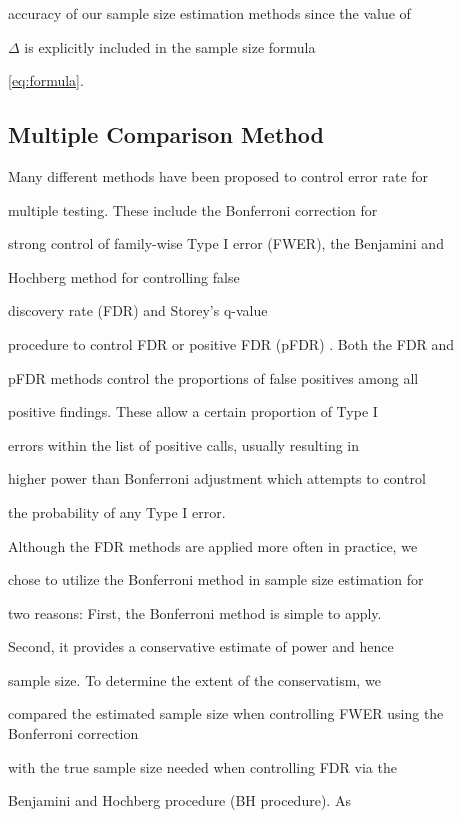 \documentclass[12pt]{article}
\begin{document}
accuracy of our sample size estimation methods since the value of

$\Delta$ is explicitly included in the sample size formula

\ref{eq:formula}.



\subsection{Multiple Comparison Method}



Many different methods have been proposed to control error rate for

multiple testing.  These include the Bonferroni correction for

strong control of family-wise Type I error (FWER), the Benjamini
and

Hochberg \citeyearpar{Benjamini95} method for controlling false

discovery rate (FDR) and Storey's \citeyearpar{Storey02} q-value

procedure to control FDR or positive FDR (pFDR) .  Both the FDR and

pFDR methods control the proportions of false positives among all

positive findings.  These allow a certain proportion of Type I

errors within the list of positive calls, usually resulting in

higher power than Bonferroni adjustment which attempts to control

the probability of any Type I error.



Although the FDR methods are applied more often in practice, we

chose to utilize the Bonferroni method in sample size estimation for

two reasons: First, the Bonferroni method is simple to apply.

Second, it provides a conservative estimate of power and hence

sample size.  To determine the extent of the conservatism, we

compared the estimated sample size when controlling FWER using the
Bonferroni correction

with the true sample size needed when controlling FDR via the

Benjamini and Hochberg \citeyearpar{Benjamini95} procedure (BH
procedure). As
\end{document}
